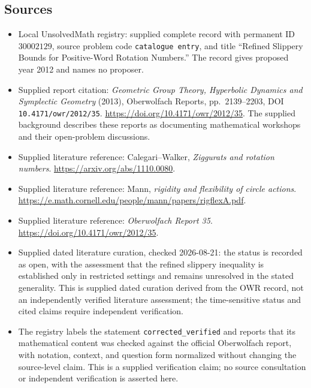 \documentclass[11pt]{article}
\begin{document}
\subsection{Sources}
\begin{itemize}
\item Local UnsolvedMath registry: supplied complete record with permanent ID \(30002129\), source problem code \texttt{catalogue entry}, and title ``Refined Slippery Bounds for Positive-Word Rotation Numbers.'' The record gives proposed year 2012 and names no proposer.
\item Supplied report citation: \emph{Geometric Group Theory, Hyperbolic Dynamics and Symplectic Geometry} (2013), Oberwolfach Reports, pp.\ 2139--2203, DOI \texttt{10.4171/owr/2012/35}. \url{https://doi.org/10.4171/owr/2012/35}. The supplied background describes these reports as documenting mathematical workshops and their open-problem discussions.
\item Supplied literature reference: Calegari--Walker, \emph{Ziggurats and rotation numbers}. \url{https://arxiv.org/abs/1110.0080}.
\item Supplied literature reference: Mann, \emph{rigidity and flexibility of circle actions}. \url{https://e.math.cornell.edu/people/mann/papers/rigflexA.pdf}.
\item Supplied literature reference: \emph{Oberwolfach Report 35}. \url{https://doi.org/10.4171/owr/2012/35}.
\item Supplied dated literature curation, checked 2026-08-21: the status is recorded as open, with the assessment that the refined slippery inequality is established only in restricted settings and remains unresolved in the stated generality. This is supplied dated curation derived from the OWR record, not an independently verified literature assessment; the time-sensitive status and cited claims require independent verification.
\item The registry labels the statement \texttt{corrected\_verified} and reports that its mathematical content was checked against the official Oberwolfach report, with notation, context, and question form normalized without changing the source-level claim. This is a supplied verification claim; no source consultation or independent verification is asserted here.
\end{itemize}
\end{document}
